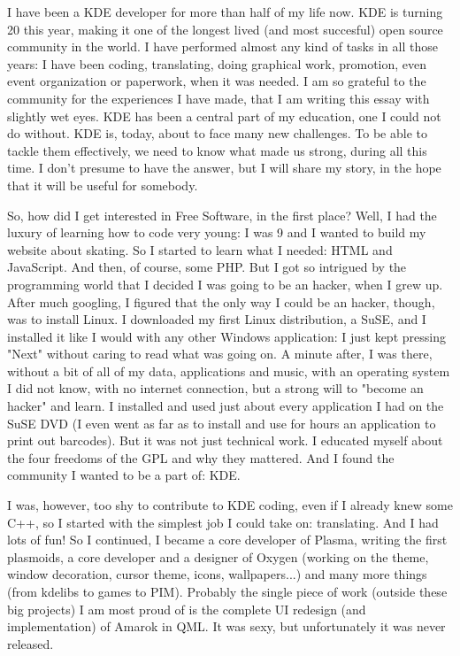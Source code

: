 

\noindent{}I have been a KDE developer for more than half of my life now. KDE is turning 20 this year, making it one of the longest lived (and most succesful) open source community in the world. I have performed almost any kind of tasks in all those years: I have been coding, translating, doing graphical work, promotion, even event organization or paperwork, when it was needed. I am so grateful to the community for the experiences I have made, that I am writing this essay with slightly wet eyes. KDE has been a central part of my education, one I could not do without. KDE is, today, about to face many new challenges. To be able to tackle them effectively, we need to know what made us strong, during all this time. I don't presume to have the answer, but I will share my story, in the hope that it will be useful for somebody.

So, how did I get interested in Free Software, in the first place? Well, I had the luxury of learning how to code very young: I was 9 and I wanted to build my website about skating. So I started to learn what I needed: HTML and JavaScript. And then, of course, some PHP. But I got so intrigued by the programming world that I decided I was going to be an hacker, when I grew up. After much googling, I figured that the only way I could be an hacker, though, was to install Linux. I downloaded my first Linux distribution, a SuSE, and I installed it like I would with any other Windows application: I just kept pressing "Next" without caring to read what was going on. A minute after, I was there, without a bit of all of my data, applications and music, with an operating system I did not know, with no internet connection, but a strong will to "become an hacker" and learn. I installed and used just about every application I had on the SuSE DVD (I even went as far as to install and use for hours an application to print out barcodes). But it was not just technical work. I educated myself about the four freedoms of the GPL and why they mattered. And I found the community I wanted to be a part of: KDE.

I was, however, too shy to contribute to KDE coding, even if I already knew some C++, so I started with the simplest job I could take on: translating. And I had lots of fun! So I continued, I became a core developer of Plasma, writing the first plasmoids, a core developer and a designer of Oxygen (working on the theme, window decoration, cursor theme, icons, wallpapers...) and many more things (from kdelibs to games to PIM). Probably the single piece of work (outside these big projects) I am most proud of is the complete UI redesign (and implementation) of Amarok in QML. It was sexy, but unfortunately it was never released.

